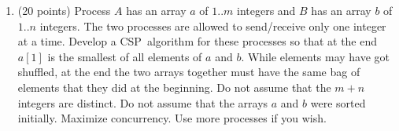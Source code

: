\documentclass[12pt]{article}
\newcommand{\CSP}{CSP}
\begin{document}
\begin{enumerate}
\item (20 points)
Process $A$ has an array $a$ of $1..m$ integers and $B$ has an array $b$
of $1..n$ integers.  The two processes are allowed to send/receive only
one integer at a time.  Develop a \CSP\ algorithm for these processes
so that at the end $a[1]$ is the smallest of all elements of $a$ and
$b$.  While elements may have got shuffled, at the end the two arrays
together must have the same bag of elements that they did at the
beginning.  Do not assume that the $m+n$ integers are distinct.
Do not assume that the arrays $a$ and $b$ were sorted initially.
Maximize concurrency.  Use more processes if you wish.

\end{enumerate}
\end{document}
